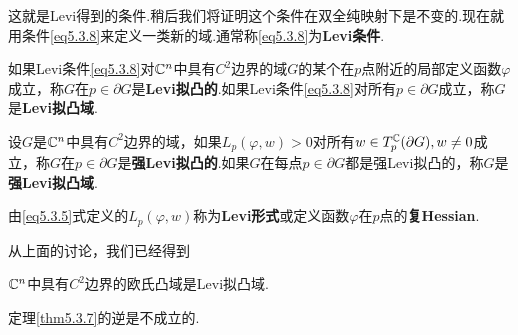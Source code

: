 这就是Levi得到的条件.稍后我们将证明这个条件在双全纯映射下是不变的.现在就用条件\eqref{eq5.3.8}来定义一类新的域.通常称\eqref{eq5.3.8}为\textbf{Levi条件}.
\begin{definition}\label{def5.3.5}
	如果Levi条件\eqref{eq5.3.8}对$\mathbb C^n$中具有$C^2$边界的域$G$的某个在$p$点附近的局部定义函数$\varphi$成立，称$G$在$p\in\partial G$是\textbf{Levi拟凸的}.如果Levi条件\eqref{eq5.3.8}对所有$p\in\partial G$成立，称$G$是\textbf{Levi拟凸域}.
\end{definition}
\begin{definition}\label{def5.3.6}
	设$G$是$\mathbb C^n$中具有$C^2$边界的域，如果$L_p(\varphi,w)>0$对所有$w\in T_p^\mathbb C(\partial G),w\neq0$成立，称$G$在$p\in\partial G$是\textbf{强Levi拟凸的}.如果$G$在每点$p\in\partial G$都是强Levi拟凸的，称$G$是\textbf{强Levi拟凸域}.
\end{definition}
由\eqref{eq5.3.5}式定义的$L_p(\varphi,w)$称为\textbf{Levi形式}或定义函数$\varphi$在$p$点的\textbf{复Hessian}.

从上面的讨论，我们已经得到
\begin{theorem}\label{thm5.3.7}
	$\mathbb C^n$中具有$C^2$边界的欧氏凸域是Levi拟凸域.
\end{theorem}
定理\ref{thm5.3.7}的逆是不成立的.

